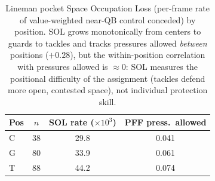 \begin{table}[h!]
\centering
\footnotesize
\begin{tabular}{lccc}
\toprule
Pos & $n$ & SOL rate ($\times 10^{3}$) & PFF press.\ allowed \\
\midrule
C & 38 & 29.8 & 0.041 \\
G & 80 & 33.9 & 0.061 \\
T & 88 & 44.2 & 0.074 \\
\bottomrule
\end{tabular}
\caption{Lineman pocket Space Occupation Loss (per-frame rate of value-weighted near-QB control conceded) by position. SOL grows monotonically from centers to guards to tackles and tracks pressures allowed \emph{between} positions ($+0.28$), but the within-position correlation with pressures allowed is $\approx 0$: SOL measures the positional difficulty of the assignment (tackles defend more open, contested space), not individual protection skill.}
\label{tab:pocket_sol_position}
\end{table}

